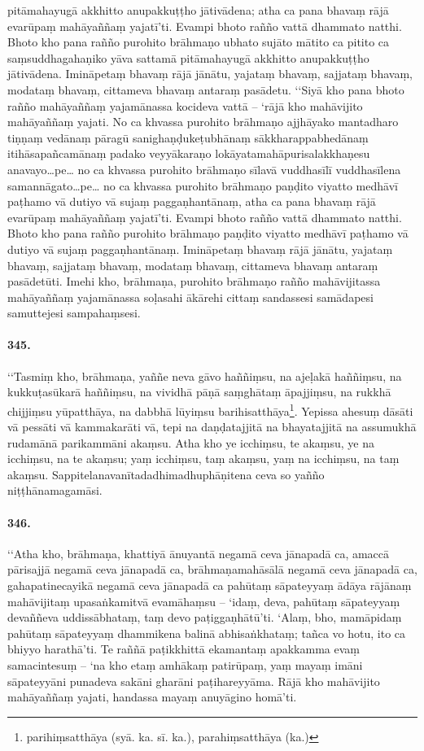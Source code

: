 pitāmahayugā akkhitto anupakkuṭṭho jātivādena; atha ca pana bhavaṃ rājā evarūpaṃ mahāyaññaṃ yajatī’ti. Evampi bhoto rañño vattā dhammato natthi. Bhoto kho pana rañño purohito brāhmaṇo ubhato sujāto mātito ca pitito ca saṃsuddhagahaṇiko yāva sattamā pitāmahayugā akkhitto anupakkuṭṭho jātivādena. Imināpetaṃ bhavaṃ rājā jānātu, yajataṃ bhavaṃ, sajjataṃ bhavaṃ, modataṃ bhavaṃ, cittameva bhavaṃ antaraṃ pasādetu. ‘‘Siyā kho pana bhoto rañño mahāyaññaṃ yajamānassa kocideva vattā – ‘rājā kho mahāvijito mahāyaññaṃ yajati. No ca khvassa purohito brāhmaṇo ajjhāyako mantadharo tiṇṇaṃ vedānaṃ pāragū sanighaṇḍukeṭubhānaṃ sākkharappabhedānaṃ itihāsapañcamānaṃ padako veyyākaraṇo lokāyatamahāpurisalakkhaṇesu anavayo…pe… no ca khvassa purohito brāhmaṇo sīlavā vuddhasīlī vuddhasīlena samannāgato…pe… no ca khvassa purohito brāhmaṇo paṇḍito viyatto medhāvī paṭhamo vā dutiyo vā sujaṃ paggaṇhantānaṃ, atha ca pana bhavaṃ rājā evarūpaṃ mahāyaññaṃ yajatī’ti. Evampi bhoto rañño vattā dhammato natthi. Bhoto kho pana rañño purohito brāhmaṇo paṇḍito viyatto medhāvī paṭhamo vā dutiyo vā sujaṃ paggaṇhantānaṃ. Imināpetaṃ bhavaṃ rājā jānātu, yajataṃ bhavaṃ, sajjataṃ bhavaṃ, modataṃ bhavaṃ, cittameva bhavaṃ antaraṃ pasādetūti. Imehi kho, brāhmaṇa, purohito brāhmaṇo rañño mahāvijitassa mahāyaññaṃ yajamānassa soḷasahi ākārehi cittaṃ sandassesi samādapesi samuttejesi sampahaṃsesi.

\paragraph{345.} ‘‘Tasmiṃ kho, brāhmaṇa, yaññe neva gāvo haññiṃsu, na ajeḷakā haññiṃsu, na kukkuṭasūkarā haññiṃsu, na vividhā pāṇā saṃghātaṃ āpajjiṃsu, na rukkhā chijjiṃsu yūpatthāya, na dabbhā lūyiṃsu barihisatthāya\footnote{parihiṃsatthāya (syā. ka. sī. ka.), parahiṃsatthāya (ka.)}. Yepissa ahesuṃ dāsāti vā pessāti vā kammakarāti vā, tepi na daṇḍatajjitā na bhayatajjitā na assumukhā rudamānā parikammāni akaṃsu. Atha kho ye icchiṃsu, te akaṃsu, ye na icchiṃsu, na te akaṃsu; yaṃ icchiṃsu, taṃ akaṃsu, yaṃ na icchiṃsu, na taṃ akaṃsu. Sappitelanavanītadadhimadhuphāṇitena ceva so yañño niṭṭhānamagamāsi.

\paragraph{346.} ‘‘Atha kho, brāhmaṇa, khattiyā ānuyantā negamā ceva jānapadā ca, amaccā pārisajjā negamā ceva jānapadā ca, brāhmaṇamahāsālā negamā ceva jānapadā ca, gahapatinecayikā negamā ceva jānapadā ca pahūtaṃ sāpateyyaṃ ādāya rājānaṃ mahāvijitaṃ upasaṅkamitvā evamāhaṃsu – ‘idaṃ, deva, pahūtaṃ sāpateyyaṃ devaññeva uddissābhataṃ, taṃ devo paṭiggaṇhātū’ti. ‘Alaṃ, bho, mamāpidaṃ pahūtaṃ sāpateyyaṃ dhammikena balinā abhisaṅkhataṃ; tañca vo hotu, ito ca bhiyyo harathā’ti. Te raññā paṭikkhittā ekamantaṃ apakkamma evaṃ samacintesuṃ – ‘na kho etaṃ amhākaṃ patirūpaṃ, yaṃ mayaṃ imāni sāpateyyāni punadeva sakāni gharāni paṭihareyyāma. Rājā kho mahāvijito mahāyaññaṃ yajati, handassa mayaṃ anuyāgino homā’ti.

